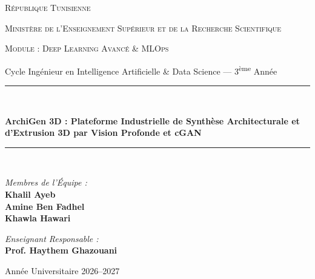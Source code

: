 \documentclass[11pt,a4paper]{report}
\begin{document}
\begin{titlepage}
\centering
{\scshape\LARGE République Tunisienne\par}
{\scshape\large Ministère de l'Enseignement Supérieur et de la Recherche Scientifique\par}
\vspace{1.5cm}

{\scshape\Large Module : Deep Learning Avancé \& MLOps\par}
{\large Cycle Ingénieur en Intelligence Artificielle \& Data Science --- 3\textsuperscript{ème} Année\par}
\vspace{1.5cm}

\rule{\linewidth}{0.5mm}\\[0.4cm]
{\huge\bfseries ArchiGen 3D : Plateforme Industrielle de Synthèse Architecturale et d'Extrusion 3D par Vision Profonde et cGAN\par}
\rule{\linewidth}{0.5mm}\\[1.5cm]

\begin{minipage}{0.48\textwidth}
\begin{flushleft} \large
\emph{Membres de l'Équipe :}\\
\textbf{Khalil Ayeb}\\
\textbf{Amine Ben Fadhel}\\
\textbf{Khawla Hawari}
\end{flushleft}
\end{minipage}
\hfill
\begin{minipage}{0.48\textwidth}
\begin{flushright} \large
\emph{Enseignant Responsable :}\\
\textbf{Prof. Haythem Ghazouani}
\end{flushright}
\end{minipage}

\vfill
{\large Année Universitaire 2026--2027\par}
\end{titlepage}
\end{document}
